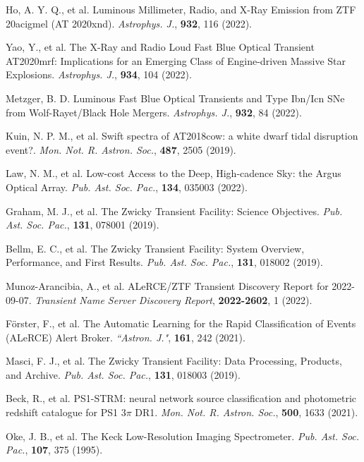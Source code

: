 \documentclass{nature_plusfigure}
\newcommand{\mn}{{Mon. Not. R. Astron. Soc.}}
\newcommand{\mnras}{\mn}
\newcommand{\aj}{{``Astron. J."}}
\newcommand{\apj}{{Astrophys. J.}}
\newcommand{\pasp}{{Pub. Ast. Soc. Pac.}}
\begin{document}
\begin{thebibliography}{100}
 Ho, A. Y. Q., et al. Luminous Millimeter, Radio, and X-Ray Emission from ZTF 20acigmel (AT 2020xnd). \emph{\apj}, \textbf{932}, 116 (2022). 

 Yao, Y., et al. The X-Ray and Radio Loud Fast Blue Optical Transient AT2020mrf: Implications for an Emerging Class of Engine-driven Massive Star Explosions. \emph{\apj}, \textbf{934}, 104 (2022). 


  Metzger, B. D. Luminous Fast Blue Optical Transients and Type Ibn/Icn SNe from Wolf-Rayet/Black Hole Mergers. \emph{\apj}, \textbf{932}, 84 (2022). 

  Kuin, N. P. M., et al. Swift spectra of AT2018cow: a white dwarf tidal disruption event?. \emph{\mnras}, \textbf{487}, 2505 (2019). 


 Law, N. M., et al. Low-cost Access to the Deep, High-cadence Sky: the Argus Optical Array. \emph{\pasp}, \textbf{134}, 035003 (2022). 

 Graham, M. J., et al. The Zwicky Transient Facility: Science Objectives. \emph{\pasp}, \textbf{131}, 078001 (2019). 

 Bellm, E. C., et al. The Zwicky Transient Facility: System Overview, Performance, and First Results. \emph{\pasp}, \textbf{131}, 018002 (2019). 


 Munoz-Arancibia, A., et al. ALeRCE/ZTF Transient Discovery Report for 2022-09-07. \emph{Transient Name Server Discovery Report}, \textbf{2022-2602}, 1 (2022). 

 Förster, F., et al. The Automatic Learning for the Rapid Classification of Events (ALeRCE) Alert Broker. \emph{\aj}, \textbf{161}, 242 (2021). 

 Masci, F. J., et al. The Zwicky Transient Facility: Data Processing, Products, and Archive. \emph{\pasp}, \textbf{131}, 018003 (2019). 

 Beck, R., et al. PS1-STRM: neural network source classification and photometric redshift catalogue for PS1 3$\pi$ DR1. \emph{\mnras}, \textbf{500}, 1633 (2021). 

 Oke, J. B., et al. The Keck Low-Resolution Imaging Spectrometer. \emph{\pasp}, \textbf{107}, 375 (1995). 


\end{thebibliography}
\end{document}
